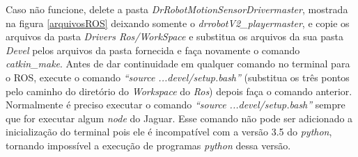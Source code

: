 Caso não funcione, delete a pasta \textit{DrRobotMotionSensorDriver\-master}, mostrada na figura \ref{arquivosROS} deixando somente o \textit{drrobotV2\_player\-master}, e copie os arquivos da pasta \textit{Drivers Ros/WorkSpace} e substitua os arquivos da sua pasta \textit{Devel} pelos arquivos da pasta fornecida e faça novamente o comando \textit{catkin\_make}. Antes de dar continuidade em qualquer comando no terminal para o ROS, execute o comando \textit{“source ...devel/setup.bash”} (substitua os três pontos pelo caminho do diretório do \textit{Workspace} do \textit{Ros}) depois faça o comando anterior. Normalmente é preciso executar o comando \textit{“source ...devel/setup.bash”} sempre que for executar algum \textit{node} do Jaguar. Esse comando não pode ser adicionado a inicialização do terminal pois ele é incompatível com a versão 3.5 do \textit{python}, tornando impossível a execução de programas \textit{python} dessa versão.

	\begin{figure}[H]
		\centering
	\end{figure}
	
